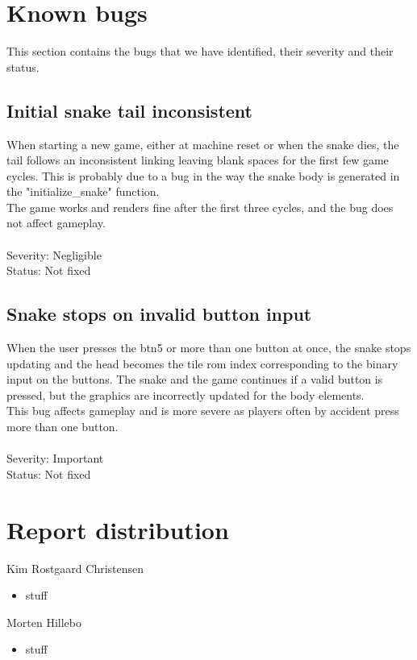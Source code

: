 \documentclass{acm_proc_article-sp}
\begin{document}
\section{Known bugs}
This section contains the bugs that we have identified, their severity and their status.
\subsection{Initial snake tail inconsistent}
When starting a new game, either at machine reset or when the snake dies, the tail follows an inconsistent linking leaving blank spaces for the first few game cycles. This is probably due to a bug in the way the snake body is generated in the "initialize\_snake" function.\\
The game works and renders fine after the first three cycles, and the bug does not affect gameplay.\\\\
Severity: Negligible\\
Status: Not fixed

\subsection{Snake stops on invalid button input}
When the user presses the btn5 or more than one button at once, the snake stops updating and the head becomes the tile rom index corresponding to the binary input on the buttons. The snake and the game continues if a valid button is pressed, but the graphics are incorrectly updated for the body elements.\\
This bug affects gameplay and is more severe as players often by accident press more than one button.\\\\
Severity: Important\\
Status: Not fixed

\section{Report distribution}
Kim Rostgaard Christensen
\begin{itemize}
\item stuff
\end{itemize}

Morten Hillebo
\begin{itemize}
\item stuff
\end{itemize}

\end{document}
